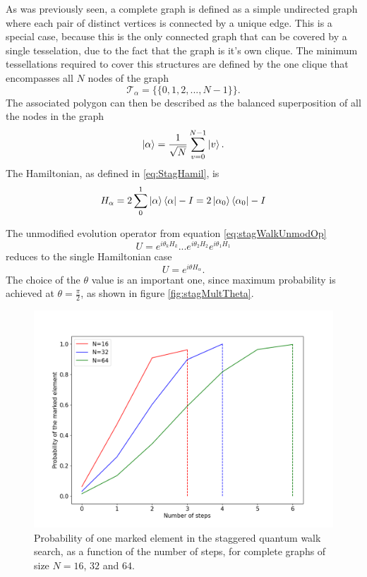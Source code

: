 \documentclass[../../dissertation.tex]{subfiles}
\begin{document}
As was previously seen, a complete graph is defined as a simple undirected
graph where each pair of distinct vertices is connected by a unique edge.  This
is a special case, because this is the only connected graph that can be covered
by a single tesselation, due to the fact that the graph is it's own clique. The
minimum tessellations required to cover this structures are defined by the one
clique that encompasses all $N$ nodes of the graph
\begin{equation}
	\mathscr{T}_{\alpha} = \{\{0,1,2,...,N-1\}\}.
\end{equation}
The associated polygon can then be described as the balanced superposition of
all the nodes in the graph
\begin{equation}
	\ket{\alpha} = \frac{1}{\sqrt{N}} \sum_{v=0}^{N-1} \ket{v}.
\end{equation}
The Hamiltonian, as defined in \ref{eq:StagHamil}, is 
\begin{equation}
	H_\alpha = 2\sum_0^1\ket{\alpha}\bra{\alpha} - I = 2\ket{\alpha_0}\bra{\alpha_0} - I
\end{equation}\par
The unmodified evolution operator from equation \ref{eq:stagWalkUnmodOp}
\begin{equation}
	U = e^{i\theta_{k}H_{k}}...e^{i\theta_{2}H_{2}}e^{i\theta_{1}H_{1}}
\end{equation}
reduces to the single Hamiltonian case
\begin{equation}
	U = e^{i\theta H_\alpha}.
	\label{eq:stagQWSearchUnmodEvo1}
\end{equation}
The choice of the $\theta$ value is an important one, since maximum probability
is achieved at $\theta = \frac{\pi}{2}$, as shown in figure
\ref{fig:stagMultTheta}.
\begin{figure}[!h]
	\centering
	\includegraphics[scale=0.40]{img/StagQuantumWalk/Search/163264.png}
	\caption{Probability of one marked element in the staggered quantum walk search, as a function of the number of steps, for complete graphs of size $N=16$, $32$ and $64$.}
	\label{fig:StagSearch}
\end{figure}\par
\end{document}

